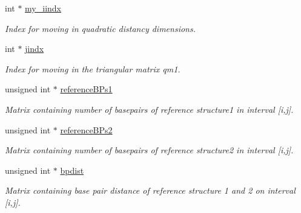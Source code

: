 \begin{DoxyCompactItemize}
\mbox{\label{structTwoDpfold__vars_ac2d3e6abf0cb0e1df363904fc938076e}} 
int $\ast$ \hyperlink{structTwoDpfold__vars_ac2d3e6abf0cb0e1df363904fc938076e}{my\+\_\+iindx}
\begin{DoxyCompactList}\small\item\em Index for moving in quadratic distancy dimensions. \end{DoxyCompactList}\item 
\mbox{\label{structTwoDpfold__vars_a0699e194a797532c91b284ab10272384}} 
int $\ast$ \hyperlink{structTwoDpfold__vars_a0699e194a797532c91b284ab10272384}{jindx}
\begin{DoxyCompactList}\small\item\em Index for moving in the triangular matrix qm1. \end{DoxyCompactList}\item 
\mbox{\label{structTwoDpfold__vars_aea15706d27b6b0fc19f5773919f43a8a}} 
unsigned int $\ast$ \hyperlink{structTwoDpfold__vars_aea15706d27b6b0fc19f5773919f43a8a}{reference\+B\+Ps1}
\begin{DoxyCompactList}\small\item\em Matrix containing number of basepairs of reference structure1 in interval \mbox{[}i,j\mbox{]}. \end{DoxyCompactList}\item 
\mbox{\label{structTwoDpfold__vars_a1221396d712bf76b7f35297f2ab35a9f}} 
unsigned int $\ast$ \hyperlink{structTwoDpfold__vars_a1221396d712bf76b7f35297f2ab35a9f}{reference\+B\+Ps2}
\begin{DoxyCompactList}\small\item\em Matrix containing number of basepairs of reference structure2 in interval \mbox{[}i,j\mbox{]}. \end{DoxyCompactList}\item 
\mbox{\label{structTwoDpfold__vars_accef8eaa05fa57ca33aa22cbc7b7aaff}} 
unsigned int $\ast$ \hyperlink{structTwoDpfold__vars_accef8eaa05fa57ca33aa22cbc7b7aaff}{bpdist}
\begin{DoxyCompactList}\small\item\em Matrix containing base pair distance of reference structure 1 and 2 on interval \mbox{[}i,j\mbox{]}. \end{DoxyCompactList}\item 

\end{DoxyCompactItemize}
